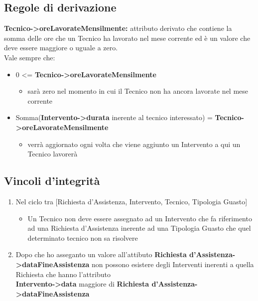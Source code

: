 \documentclass[legalpaper]{article}
\begin{document}
\subsection{Regole di derivazione}
\textbf{Tecnico->oreLavorateMensilmente:} attributo derivato che contiene la somma delle ore che un Tecnico ha lavorato nel mese corrente ed è un valore che deve essere maggiore o uguale a zero.\\
Vale sempre che: 
\begin{itemize}
	\item  0 <= \textbf{Tecnico->oreLavorateMensilmente}
		\begin{itemize}\item sarà zero nel momento in cui il Tecnico non ha ancora lavorate nel mese corrente\end{itemize}
	\item Somma(\textbf{Intervento->durata} inerente al tecnico interessato) = \textbf{Tecnico->oreLavorateMensilmente}
		\begin{itemize}
		\item verrà aggiornato ogni volta che viene aggiunto un Intervento a qui un Tecnico lavorerà
		\end{itemize}
\end{itemize}
\subsection{Vincoli d'integrità}
	\begin{enumerate}
	\item Nel ciclo tra [Richiesta d'Assistenza, Intervento, Tecnico, Tipologia Guasto]
		\begin{itemize}
		\item Un Tecnico non deve essere assegnato ad un Intervento che fa riferimento ad una Richiesta d'Assistenza inerente ad una Tipologia Guasto che quel determinato tecnico non sa risolvere
		\end{itemize}
	\item Dopo che ho asseganto un valore all'attibuto \textbf{Richiesta d'Assistenza->dataFineAssistenza} non possono esistere degli Interventi inerenti a quella Richiesta che hanno l'attributo\\
\textbf{Intervento->data} maggiore di \textbf{Richiesta d'Assistenza->dataFineAssistenza}
\end{enumerate}
\end{document}
